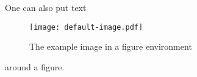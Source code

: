 One can also put text
\begin{figure}
	\centering
	\texttt{[image: default-image.pdf]}
	\caption{The example image in a figure environment}
\end{figure}
around a figure.
